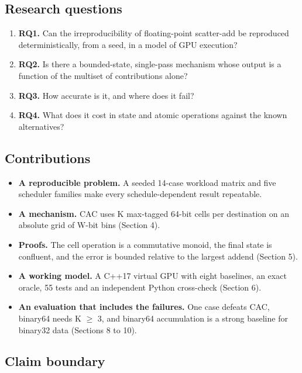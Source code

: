 \documentclass[journal]{IEEEtran}
\begin{document}
\hypertarget{research-questions}{%
\subsection{Research questions}\label{research-questions}}

\begin{enumerate}
\def\labelenumi{\arabic{enumi}.}
\item
  \textbf{RQ1.} Can the irreproducibility of floating-point scatter-add
  be reproduced deterministically, from a seed, in a model of GPU
  execution?
\item
  \textbf{RQ2.} Is there a bounded-state, single-pass mechanism whose
  output is a function of the multiset of contributions alone?
\item
  \textbf{RQ3.} How accurate is it, and where does it fail?
\item
  \textbf{RQ4.} What does it cost in state and atomic operations against
  the known alternatives?
\end{enumerate}

\hypertarget{contributions}{%
\subsection{Contributions}\label{contributions}}

\begin{itemize}
\item
  \textbf{A reproducible problem.} A seeded 14-case workload matrix and
  five scheduler families make every schedule-dependent result
  repeatable.
\item
  \textbf{A mechanism.} CAC uses K max-tagged 64-bit cells per
  destination on an absolute grid of W-bit bins (Section 4).
\item
  \textbf{Proofs.} The cell operation is a commutative monoid, the final
  state is confluent, and the error is bounded relative to the largest
  addend (Section 5).
\item
  \textbf{A working model.} A C++17 virtual GPU with eight baselines, an
  exact oracle, 55 tests and an independent Python cross-check (Section
  6).
\item
  \textbf{An evaluation that includes the failures.} One case defeats
  CAC, binary64 needs K $\geq$ 3, and binary64 accumulation is a strong
  baseline for binary32 data (Sections 8 to 10).
\end{itemize}

\hypertarget{claim-boundary}{%
\subsection{Claim boundary}\label{claim-boundary}}
\end{document}
